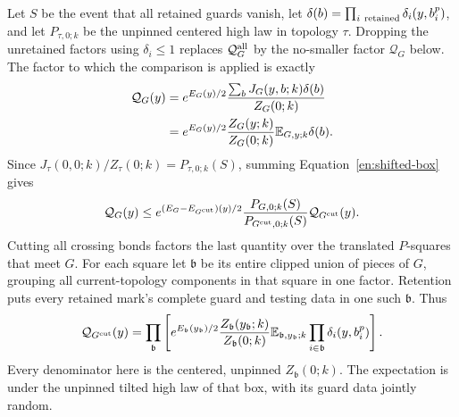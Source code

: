 Let $S$ be the event that all retained guards vanish, let
$\delta(b)=\prod_{i\ {\rm retained}}\delta_i(y,b_i^p)$, and let
$P_{\tau,0;k}$ be
the unpinned centered high law in topology $\tau$.  Dropping the
unretained factors using $\delta_i\le1$ replaces
$\mathcal Q_G^{\rm all}$ by the no-smaller factor $\mathcal Q_G$ below.
The factor
to which the comparison is applied is exactly
\[
 \begin{split}
 \mathcal Q_G(y)
 &=e^{E_G(y)/2}
       \frac{\sum_bJ_G(y,b;k)\delta(b)}{Z_G(0;k)}\\
 &=e^{E_G(y)/2}\frac{Z_G(y;k)}{Z_G(0;k)}
                     \mathbb E_{G,y;k}\delta(b).
 \end{split}
\]
Since $J_\tau(0,0;k)/Z_\tau(0;k)=P_{\tau,0;k}(S)$,
summing Equation~\eqref{en:shifted-box} gives
\[
 \mathcal Q_G(y)\le
 e^{(E_G-E_{G^{\rm cut}})(y)/2}
 \frac{P_{G,0;k}(S)}{P_{G^{\rm cut},0;k}(S)}
 \mathcal Q_{G^{\rm cut}}(y).
\]
Cutting all crossing bonds factors the last quantity over the
translated $P$-squares that meet $G$.  For each square let
$\mathfrak b$ be its entire clipped union of pieces of $G$, grouping
all current-topology components in that square in one factor.
Retention puts every retained mark's complete guard and testing
data in one such $\mathfrak b$.  Thus
\[
 \mathcal Q_{G^{\rm cut}}(y)=
 \prod_{\mathfrak b}
 \left[
 e^{E_{\mathfrak b}(y_{\mathfrak b})/2}
 \frac{Z_{\mathfrak b}(y_{\mathfrak b};k)}{Z_{\mathfrak b}(0;k)}
 \mathbb E_{\mathfrak b,y_{\mathfrak b};k}
       \prod_{i\in\mathfrak b}\delta_i(y,b_i^p)
 \right].
\]
Every denominator here is the centered, unpinned
$Z_{\mathfrak b}(0;k)$.  The expectation is under the unpinned
tilted high law of that box, with its guard data jointly random.

